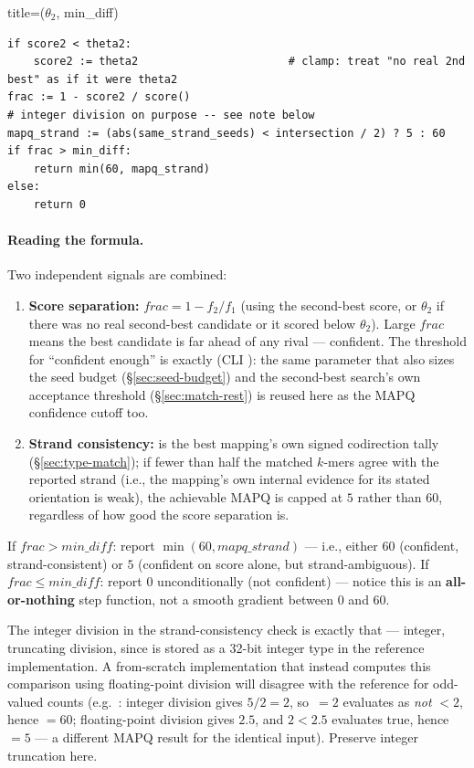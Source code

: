 \begin{algobox}{title={($\theta_2$, min\_diff)}}
\begin{verbatim}
if score2 < theta2:
    score2 := theta2                       # clamp: treat "no real 2nd best" as if it were theta2
frac := 1 - score2 / score()
# integer division on purpose -- see note below
mapq_strand := (abs(same_strand_seeds) < intersection / 2) ? 5 : 60
if frac > min_diff:
    return min(60, mapq_strand)
else:
    return 0
\end{verbatim}
\end{algobox}

\paragraph{Reading the formula.} Two independent signals are combined:
\begin{enumerate}
  \item \textbf{Score separation:} $\mathit{frac} = 1 - f_2/f_1$ (using the second-best score, or
    $\theta_2$ if there was no real second-best candidate or it scored below $\theta_2$). Large
    $\mathit{frac}$ means the best candidate is far ahead of any rival --- confident. The
    threshold for ``confident enough'' is exactly  (CLI ): the same
    parameter that also sizes the seed budget (\S\ref{sec:seed-budget}) and the second-best
    search's own acceptance threshold (\S\ref{sec:match-rest}) is reused here as the MAPQ
    confidence cutoff too.
  \item \textbf{Strand consistency:}  is the best mapping's own signed
    codirection tally (\S\ref{sec:type-match}); if fewer than half the matched $k$-mers agree with
    the reported strand (i.e., the mapping's own internal evidence for its stated orientation is
    weak), the achievable MAPQ is capped at $5$ rather than $60$, regardless of how good the score
    separation is.
\end{enumerate}
If $\mathit{frac} > \mathit{min\_diff}$: report $\min(60, \mathit{mapq\_strand})$ --- i.e., either
$60$ (confident, strand-consistent) or $5$ (confident on score alone, but strand-ambiguous). If
$\mathit{frac} \le \mathit{min\_diff}$: report $0$ unconditionally (not confident) --- notice this
is an \textbf{all-or-nothing} step function, not a smooth gradient between $0$ and $60$.

\begin{notebox}
The integer division  in the strand-consistency check is exactly that ---
integer, truncating division, since  is stored as a 32-bit integer type in the
reference implementation. A from-scratch implementation that instead computes this comparison
using floating-point division will disagree with the reference for odd-valued
 counts (e.g.\ : integer division gives $5/2=2$, so
$\,=2$ evaluates as \emph{not} $<2$, hence $=60$;
floating-point division gives $2.5$, and $2 < 2.5$ evaluates true, hence $=5$
--- a different MAPQ result for the identical input). Preserve integer truncation here.
\end{notebox}

